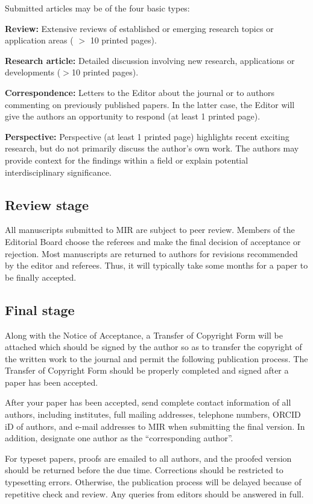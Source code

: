 \documentclass[journal,a4paper]{IEEEtran}
\begin{document}
Submitted articles may be of the four basic types:

\textbf{Review:} Extensive reviews of established or emerging research topics or application areas ( $>$ 10 printed pages).

\textbf{Research article:} Detailed discussion involving new research, applications or developments ($>$10 printed pages).

\textbf{Correspondence:} Letters to the Editor about the journal or to authors commenting on previously published papers. In the latter case, the Editor will give the authors an opportunity to respond (at least 1 printed page).

\textbf{Perspective:} Perspective (at least 1 printed page) highlights recent exciting research, but do not primarily discuss the author's own work. The authors may provide context for the findings within a field or explain potential interdisciplinary significance.

\subsection{Review stage}

All manuscripts submitted to MIR are subject to peer review. Members of the Editorial Board choose the referees and make the final decision of acceptance or rejection. Most manuscripts are returned to authors for revisions recommended by the editor and referees. Thus, it will typically take some months for a paper to be finally accepted.

\subsection{Final stage}

Along with the Notice of Acceptance, a Transfer of Copyright Form will be attached which should be signed by the author so as to transfer the copyright of the written work to the journal and permit the following publication process. The Transfer of Copyright Form should be properly completed and signed after a paper has been accepted.

After your paper has been accepted, send complete contact information of all authors, including institutes, full mailing addresses, telephone numbers, ORCID iD of authors, and e-mail addresses to MIR when submitting the final version. In addition, designate one author as the ``corresponding author''.

For typeset papers, proofs are emailed to all authors, and the proofed version should be returned before the due time. Corrections should be restricted to typesetting errors. Otherwise, the publication process will be delayed because of repetitive check and review. Any queries from editors should be answered in full.
\end{document}
